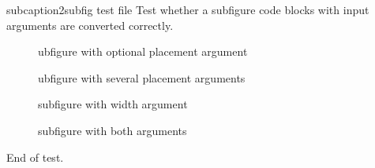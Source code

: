 subcaption2subfig test file
Test whether a subfigure code blocks with input arguments are converted
correctly.

\begin{subfigure}[b]
subfigure with optional placement argument
\end{subfigure}

\begin{subfigure}[bthp]
subfigure with several placement arguments
\end{subfigure}

\begin{subfigure}{0.2\linewidth}
subfigure with width argument
\end{subfigure}

\begin{subfigure}[b]{0.5\linewidth}
subfigure with both arguments
\end{subfigure}

End of test.
